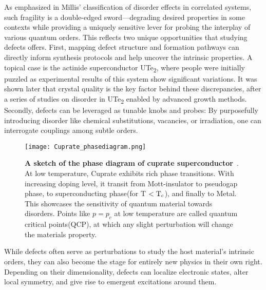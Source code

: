 As emphasized in Millis’ classification of disorder effects in correlated systems\cite{millisClassificationEffectsDisorder2003}, such fragility is a double-edged sword—degrading desired properties in some contexts while providing a uniquely sensitive lever for probing the interplay of various quantum orders. This reflects two unique opportunities that studying defects offers. First, mapping defect structure and formation pathways can directly inform synthesis protocols and help uncover the intrinsic properties. A topical case is the actinide superconductor UTe\textsubscript{2}, where people were initially puzzled as experimental results of this system show significant variations. It was shown later that crystal quality is the key factor behind these discrepancies, after a series of studies on disorder in UTe\textsubscript{2} enabled by advanced growth methods\cite{aishwaryaMeltingChargeDensity2024,xueAdvancesSingleCrystal2025}. Secondly, defects can be leveraged as tunable knobs and probes: By purposefully introducing disorder like chemical substitutions, vacancies, or irradiation, one can interrogate couplings among subtle orders\cite{fradkinIntertwinedOrdersPhysics2025,ohDisentanglingIntertwinedOrders2025}.   

\begin{figure} 
	\centering
	\texttt{[image: Cuprate\_phasediagram.png]}
	\caption[\textbf{A sketch of the phase diagram of cuprate superconductor}]{\textbf{A sketch of the phase diagram of cuprate superconductor}~\cite{tailleferScatteringPairingCuprate2010}. At low temperature, Cuprate exhibits rich phase transitions. With increasing doping level, it transit from Mott-insulator to pseudogap phase, to superconducting phase(for T $< \text{T}\textsubscript{c}$), and finally to Metal. This showcases the sensitivity of quantum material towards disorders. Points like $p=p_c$ at low temperature are called quantum critical points(QCP), at which any slight perturbation will change the materials property.}
	\label{fig:cuprate_pd}
\end{figure}

While defects often serve as perturbations to study the host material’s intrinsic orders, they can also become the stage for entirely new physics in their own right. Depending on their dimensionality, defects can localize electronic states, alter local symmetry, and give rise to emergent excitations around them.

